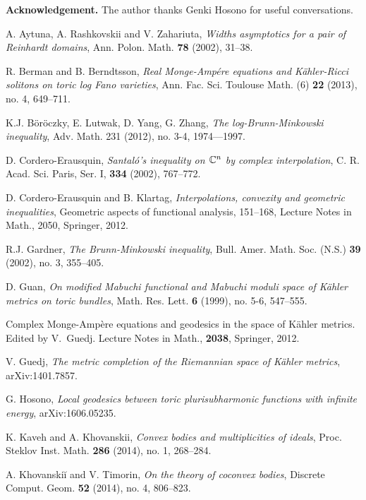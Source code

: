 \documentclass[12pt]{article}
\numberwithin{equation}{section}
\newcommand{\Cn}{{\mathbb  C\sp n}}
\begin{document}
\bigskip
{\small {\bf Acknowledgement.}
The author thanks Genki Hosono for useful conversations.}


\begin{thebibliography}{19}

A. Aytuna, A. Rashkovskii and V. Zahariuta, {\sl Widths asymptotics for a pair of
Reinhardt domains}, Ann. Polon. Math. {\bf 78} (2002), 31--38.

R. Berman and B. Berndtsson, {\sl
Real Monge-Amp\'ere equations and K\"{a}hler-Ricci solitons on toric log Fano varieties},
Ann. Fac. Sci. Toulouse Math. (6) {\bf 22} (2013), no. 4, 649--711.

 K.J. B\"{o}r\"{o}czky, E. Lutwak, D. Yang, G. Zhang, {\sl The log-Brunn-Minkowski inequality}, Adv. Math. 231 (2012), no. 3-4, 1974---1997.

D. Cordero-Erausquin, {\sl Santal\'{o}'s inequality on $\Cn$ by complex interpolation}, C. R. Acad. Sci. Paris, Ser. I, {\bf 334} (2002), 767--772.

D. Cordero-Erausquin and B. Klartag, {\it Interpolations, convexity and geometric inequalities}, Geometric aspects of functional analysis, 151--168, Lecture Notes in Math., 2050, Springer, 2012.

 R.J. Gardner, {\sl The Brunn-Minkowski inequality}, Bull. Amer. Math. Soc. (N.S.) {\bf 39} (2002), no. 3, 355--405.

{D. Guan}, {\sl
On modified Mabuchi functional and Mabuchi moduli space of K\"{a}hler metrics on toric bundles},
Math. Res. Lett. {\bf 6} (1999), no. 5-6, 547--555.

 Complex Monge-Ampère equations and geodesics in the space of Kähler metrics. Edited by V.~Guedj. Lecture Notes in Math., {\bf 2038}, Springer, 2012.

{ V. Guedj}, {\sl  The metric completion of the Riemannian space of K\"{a}hler metrics}, arXiv:1401.7857.

 G. Hosono, {\sl Local geodesics between toric plurisubharmonic functions with infinite energy}, arXiv:1606.05235.


 K. Kaveh and A. Khovanskii,  {\sl Convex bodies and multiplicities of ideals}, Proc. Steklov Inst. Math. {\bf 286} (2014), no. 1, 268--284.

A. Khovanskiĭ and V. Timorin, {\sl
On the theory of coconvex bodies},
Discrete Comput. Geom. {\bf 52} (2014), no. 4, 806--823.


\end{thebibliography}
\end{document}
